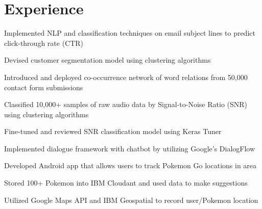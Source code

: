 \documentclass[]{deedy-resume-openfont}
\begin{document}
\hfill
\begin{minipage}[t]{0.66\textwidth} 


\section{Experience}

\sectionsep
\begin{tightemize} 
\item Implemented NLP and classification techniques on email subject lines to predict click-through rate (CTR)
\item Devised customer segmentation model using clustering algorithms 
\item Introduced and deployed co-occurrence network of word relations from 50,000 contact form submissions
\end{tightemize}
\sectionsep

\begin{tightemize} 
\item Classified 10,000+ samples of raw audio data by Signal-to-Noise Ratio (SNR) using clustering algorithms
\item Fine-tuned and reviewed SNR classification model using Keras Tuner
\item Implemented dialogue framework with chatbot by utilizing Google's DialogFlow
\end{tightemize}
\sectionsep


\begin{tightemize} 
\item Developed Android app that allows users to track Pokemon Go locations in area 
\item Stored 100+ Pokemon into IBM Cloudant and used data to make suggestions
\item  Utilized Google Maps API and IBM Geospatial to record user/Pokemon location
\end{tightemize}
\sectionsep


\end{minipage}
\end{document}
